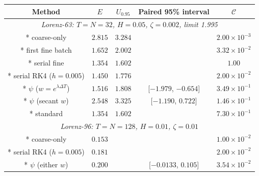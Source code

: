 \setlength{\tabcolsep}{10pt}\renewcommand{\arraystretch}{1.15}
\begin{tabular}{@{}ccccc@{}}\toprule
Method & $E$ & $U_{0.95}$ & Paired 95\% interval & $\mathcal{C}$\\
\midrule
\multicolumn{5}{c}{\textit{Lorenz-63: $T = N = 32$, $H = 0.05$, $\zeta = 0.002$, limit 1.995}}\\*
coarse-only & $2.815$ & $3.284$ &  & $2.00\times 10^{-3}$\\*
first fine batch & $1.652$ & $2.002$ &  & $3.32\times 10^{-2}$\\*
serial fine & $1.354$ & $1.602$ &  & $1.00$\\*
serial RK4 ($h=0.005$) & $1.450$ & $1.776$ &  & $2.00\times 10^{-2}$\\*
$\psi$ ($w=e^{\lambda\Delta T}$) & $1.516$ & $1.808$ & [$-1.979$, $-0.654$] & $3.49\times 10^{-1}$\\*
$\psi$ (secant $w$) & $2.548$ & $3.325$ & [$-1.190$, $0.722$] & $1.46\times 10^{-1}$\\*
standard & $1.354$ & $1.602$ &  & $7.30\times 10^{-1}$\\
\midrule
\multicolumn{5}{c}{\textit{Lorenz-96: $T = N = 128$, $H = 0.01$, $\zeta = 0.01$}}\\*
coarse-only & $0.153$ &  &  & $1.00\times 10^{-2}$\\*
serial RK4 ($h=0.005$) & $0.181$ &  &  & $2.00\times 10^{-2}$\\*
$\psi$ (either $w$) & $0.200$ &  & [$-0.0133$, $0.105$] & $3.54\times 10^{-2}$\\
\bottomrule\end{tabular}
